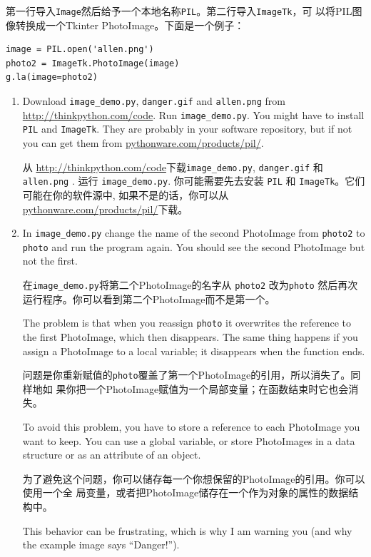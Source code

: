 \documentclass[10pt]{book}
\begin{document}
\begin{CJK}{UTF8}{gbsn}
\begin{exercise}
第一行导入{\tt Image}然后给予一个本地名称{\tt PIL}。第二行导入{\tt ImageTk}，可
以将PIL图像转换成一个Tkinter PhotoImage。下面是一个例子：

\begin{verbatim}
image = PIL.open('allen.png')
photo2 = ImageTk.PhotoImage(image)
g.la(image=photo2)
\end{verbatim}
%

\begin{enumerate}

\item Download \verb"image_demo.py", \verb"danger.gif" and \verb"allen.png"
from \url{http://thinkpython.com/code}.  Run \verb"image_demo.py".  You
might have to install {\tt PIL} and {\tt ImageTk}.  
They are probably in your software repository,  but if not
you can get them from \url{pythonware.com/products/pil/}.


从 \url{http://thinkpython.com/code}下载\verb"image_demo.py", \verb"danger.gif"
和 \verb"allen.png" .  运行 \verb"image_demo.py".  你可能需要先去安装 {\tt PIL}
和 {\tt ImageTk}。它们可能在你的软件源中,  如果不是的话，你可以从
\url{pythonware.com/products/pil/}下载。

\item In \verb"image_demo.py" change the name of the second
PhotoImage from {\tt photo2} to {\tt photo} and run the program
again.  You should see the second PhotoImage but not the first.

在\verb"image_demo.py"将第二个PhotoImage的名字从 {\tt photo2} 改为{\tt photo}
然后再次运行程序。你可以看到第二个PhotoImage而不是第一个。

The problem is that when you reassign {\tt photo} it overwrites
the reference to the first PhotoImage, which then disappears.  The
same thing happens if you assign a PhotoImage to a local
variable; it disappears when the function ends.

问题是你重新赋值的{\tt photo}覆盖了第一个PhotoImage的引用，所以消失了。同样地如
果你把一个PhotoImage赋值为一个局部变量；在函数结束时它也会消失。

To avoid this problem, you have to store a reference to each
PhotoImage you want to keep.  You can use a global variable, or
store PhotoImages in a data structure or as an attribute of
an object.

为了避免这个问题，你可以储存每一个你想保留的PhotoImage的引用。你可以使用一个全
局变量，或者把PhotoImage储存在一个作为对象的属性的数据结构中。

This behavior can be frustrating, which is why I am warning
you (and why the example image says ``Danger!'').


\end{enumerate}
\end{exercise}
\end{CJK}
\end{document}
